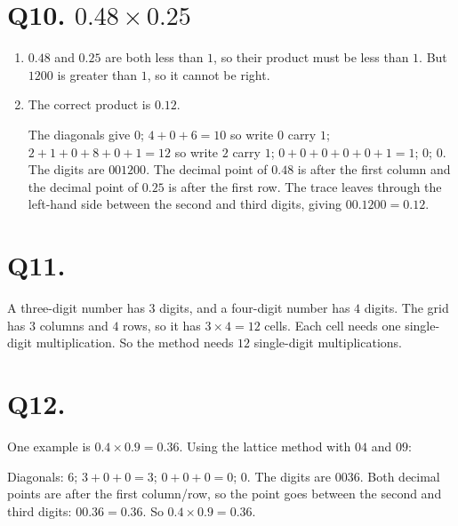 \documentclass[12pt,a4paper]{article}
\newcommand{\lsetup}[2]{%
  \edef\lC{\the\numexpr#1\relax}\edef\lR{\the\numexpr#2\relax}%
  \edef\lCm{\the\numexpr#1-1\relax}\edef\lRm{\the\numexpr#2-1\relax}}
\newcommand{\lgrid}{%
  \draw[thick] (0,0) rectangle (\lC,\lR);
  \foreach \i in {1,...,\lCm}{\draw (\i,0) -- (\i,\lR);}
  \foreach \j in {1,...,\lRm}{\draw (0,\j) -- (\lC,\j);}
  \foreach \i in {1,...,\lC}{\foreach \j in {1,...,\lR}{%
    \draw[gray!75] ({\i-1},{\j-1}) -- (\i,\j);}}}
\newcommand{\ltop}[2]{\node[font=\small] at ({#1-0.5},{\lR+0.34}) {#2};}
\newcommand{\lside}[2]{\node[font=\small] at ({\lC+0.34},{\lR-#1+0.5}) {#2};}
\newcommand{\lcell}[4]{%
  \node[font=\small] at ({#1-0.72},{\lR-#2+0.70}) {#3};
  \node[font=\small] at ({#1-0.28},{\lR-#2+0.30}) {#4};}
\newcommand{\lleft}[2]{\node[font=\small] at (-0.44,{\lR-#1+0.5}) {#2};}
\newcommand{\lbot}[2]{\node[font=\small] at ({#1-0.5},-0.42) {#2};}
\newcommand{\ltopdot}[1]{\fill (#1,{\lR+0.2}) circle (1.8pt);}
\newcommand{\lsidedot}[1]{\fill ({\lC+0.34},{\lR-#1}) circle (1.8pt);}
\newcommand{\lmeet}[2]{%
  \pgfmathsetmacro{\lmx}{#1}%
  \pgfmathsetmacro{\lmy}{\lR-#2}%
  \pgfmathsetmacro{\lts}{min(\lmx,\lmy)}%
  \pgfmathsetmacro{\lex}{\lmx-\lts}%
  \pgfmathsetmacro{\ley}{\lmy-\lts}%
  \pgfmathsetmacro{\ldx}{\lex<0.5 ? -0.44 : \lex}%
  \pgfmathsetmacro{\ldy}{\ley<0.5 ? -0.42 : \ley}}
\newcommand{\ltrace}[2]{\lmeet{#1}{#2}%
  \draw[red!75!black,dashed,-{Stealth[length=2mm]}] ({\lmx},{\lR+0.1}) -- ({\lmx},{\lmy});
  \draw[red!75!black,dashed,-{Stealth[length=2mm]}] ({\lC+0.12},{\lmy}) -- ({\lmx},{\lmy});
  \ifdim\lts pt>0.1pt
    \draw[red!75!black,dashed,thick,-{Stealth[length=2mm]}] ({\lmx},{\lmy}) -- ({\lex},{\ley});
  \fi
  \fill[red!75!black] ({\ldx},{\ldy}) circle (2.1pt);}
\begin{document}
\section*{Q10. $0.48\times0.25$}
\begin{enumerate}[label=(\alph*)]
  \item $0.48$ and $0.25$ are both less than $1$, so their product must be less than $1$. But $1200$ is greater than $1$, so it cannot be right.
  \item The correct product is $0.12$. 
  \begin{center}
  \end{center}
  The diagonals give $0$; $4+0+6=10$ so write $0$ carry $1$; $2+1+0+8+0+1=12$ so write $2$ carry $1$; $0+0+0+0+0+1=1$; $0$; $0$. The digits are $001200$. The decimal point of $0.48$ is after the first column and the decimal point of $0.25$ is after the first row. The trace leaves through the left-hand side between the second and third digits, giving $00.1200=0.12$.
\end{enumerate}

\section*{Q11.}
A three-digit number has $3$ digits, and a four-digit number has $4$ digits. The grid has $3$ columns and $4$ rows, so it has $3\times4=12$ cells. Each cell needs one single-digit multiplication. So the method needs $12$ single-digit multiplications.

\section*{Q12.}
One example is $0.4\times0.9=0.36$. 
Using the lattice method with $04$ and $09$:
\begin{center}
\end{center}
Diagonals: $6$; $3+0+0=3$; $0+0+0=0$; $0$. The digits are $0036$. Both decimal points are after the first column/row, so the point goes between the second and third digits: $00.36=0.36$. So $0.4\times0.9=0.36$.
\end{document}
